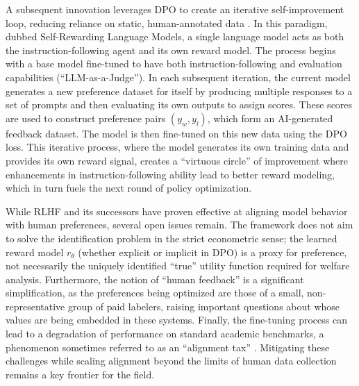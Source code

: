 A subsequent innovation leverages DPO to create an iterative self-improvement loop, reducing reliance on static, human-annotated data \citep{yuan2024self}. In this paradigm, dubbed Self-Rewarding Language Models, a single language model acts as both the instruction-following agent and its own reward model. The process begins with a base model fine-tuned to have both instruction-following and evaluation capabilities (``LLM-as-a-Judge''). In each subsequent iteration, the current model generates a new preference dataset for itself by producing multiple responses to a set of prompts and then evaluating its own outputs to assign scores. These scores are used to construct preference pairs $(y_w, y_l)$, which form an AI-generated feedback dataset. The model is then fine-tuned on this new data using the DPO loss. This iterative process, where the model generates its own training data and provides its own reward signal, creates a ``virtuous circle'' of improvement where enhancements in instruction-following ability lead to better reward modeling, which in turn fuels the next round of policy optimization.

While RLHF and its successors have proven effective at aligning model behavior with human preferences, several open issues remain. The framework does not aim to solve the identification problem in the strict econometric sense; the learned reward model $r_\theta$ (whether explicit or implicit in DPO) is a proxy for preference, not necessarily the uniquely identified ``true'' utility function required for welfare analysis. Furthermore, the notion of ``human feedback'' is a significant simplification, as the preferences being optimized are those of a small, non-representative group of paid labelers, raising important questions about whose values are being embedded in these systems. Finally, the fine-tuning process can lead to a degradation of performance on standard academic benchmarks, a phenomenon sometimes referred to as an ``alignment tax'' \citep{ouyang2022training}. Mitigating these challenges while scaling alignment beyond the limits of human data collection remains a key frontier for the field.
